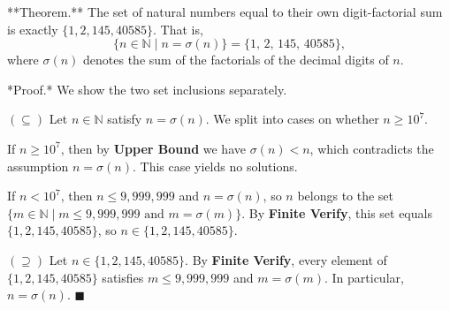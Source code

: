 **Theorem.** The set of natural numbers equal to their own digit-factorial sum is exactly $\{1, 2, 145, 40585\}$. That is,
$$\{n \in \mathbb{N} \mid n = \sigma(n)\} = \{1,\, 2,\, 145,\, 40585\},$$
where $\sigma(n)$ denotes the sum of the factorials of the decimal digits of $n$.

*Proof.* We show the two set inclusions separately.

$(\subseteq)$ Let $n \in \mathbb{N}$ satisfy $n = \sigma(n)$. We split into cases on whether $n \geq 10^7$.

If $n \geq 10^7$, then by \textbf{Upper Bound} we have $\sigma(n) < n$, which contradicts the assumption $n = \sigma(n)$. This case yields no solutions.

If $n < 10^7$, then $n \leq 9{,}999{,}999$ and $n = \sigma(n)$, so $n$ belongs to the set $\{m \in \mathbb{N} \mid m \leq 9{,}999{,}999 \text{ and } m = \sigma(m)\}$. By \textbf{Finite Verify}, this set equals $\{1, 2, 145, 40585\}$, so $n \in \{1, 2, 145, 40585\}$.

$(\supseteq)$ Let $n \in \{1, 2, 145, 40585\}$. By \textbf{Finite Verify}, every element of $\{1, 2, 145, 40585\}$ satisfies $m \leq 9{,}999{,}999$ and $m = \sigma(m)$. In particular, $n = \sigma(n)$. $\blacksquare$